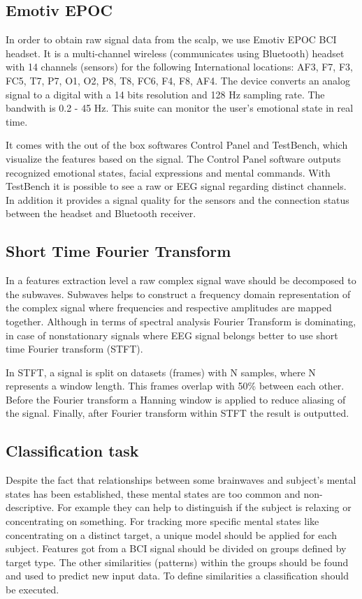 \documentclass[12pt]{article}
\begin{document}
\subsection{Emotiv EPOC}

In order to obtain raw signal data from the scalp, we use Emotiv EPOC BCI headset. It is a multi-channel wireless (communicates using Bluetooth) headset with 14 channels (sensors) for the following International locations: AF3, F7, F3, FC5, T7, P7, O1, O2, P8, T8, FC6, F4, F8, AF4. The device converts an analog signal to a digital with a 14 bits resolution and 128 Hz sampling rate. The bandwith is 0.2 - 45 Hz. This suite can monitor the user's emotional state in real time.\cite{emotiv}

It comes with the out of the box softwares Control Panel and TestBench, which visualize the features based on the signal. The Control Panel software outputs recognized emotional states, facial expressions and mental commands. With TestBench it is possible to see a raw or EEG signal regarding distinct channels. In addition it provides a signal quality for the sensors and the connection status between the headset and Bluetooth receiver.
\subsection{Short Time Fourier Transform}

In a features extraction level a raw complex signal wave should be decomposed to the subwaves. Subwaves helps to construct a frequency domain representation of the complex signal where frequencies and respective amplitudes are mapped together. Although in terms of spectral analysis Fourier Transform is dominating, in case of nonstationary signals where EEG signal belongs better to use short time Fourier transform (STFT).\cite{alfahoum_fft}

In STFT, a signal is split on datasets (frames) with N samples, where N represents a window length. This frames overlap with 50\% between each other. Before the Fourier transform a Hanning window is applied to reduce aliasing of the signal. Finally, after Fourier transform within STFT the result is outputted.

\subsection{Classification task}

Despite the fact that relationships between some brainwaves and subject's mental states has been established, these mental states are too common and non-descriptive. For example they can help to distinguish if the subject is relaxing or concentrating on something. For tracking more specific mental states like concentrating on a distinct target, a unique model should be applied for each subject. Features got from a BCI signal should be divided on groups defined by target type. The other similarities (patterns) within the groups should be found and used to predict new input data. To define similarities a classification should be executed.
\end{document}
